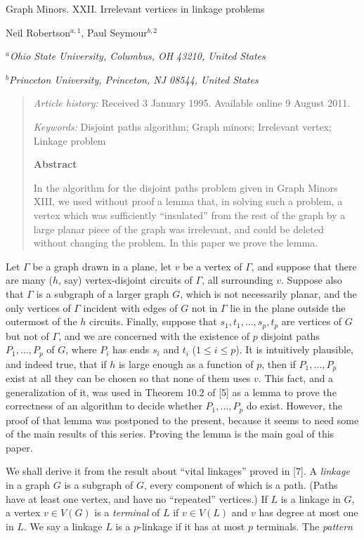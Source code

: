 {\centering
{\Large Graph Minors. XXII. Irrelevant vertices in linkage problems\par}\medskip

Neil Robertson$^{a,1}$, Paul Seymour$^{b,2}$\par
$^a$\textit{Ohio State University, Columbus, OH 43210, United States}\par
$^b$\textit{Princeton University, Princeton, NJ 08544, United States}\par
}
\begin{quote}
\textit{Article history:} Received 3 January 1995. Available online 9 August 2011.

\textit{Keywords:} Disjoint paths algorithm; Graph minors; Irrelevant vertex; Linkage problem

\textbf{Abstract}

In the algorithm for the disjoint paths problem given in Graph Minors XIII, we used without proof a lemma that, in solving such a problem, a vertex which was sufficiently ``insulated'' from the rest of the graph by a large planar piece of the graph was irrelevant, and could be deleted without changing the problem. In this paper we prove the lemma.
\end{quote}


Let $\Gamma$ be a graph drawn in a plane, let $v$ be a vertex of $\Gamma$, and suppose that there are many ($h$, say) vertex-disjoint circuits of $\Gamma$, all surrounding $v$. Suppose also that $\Gamma$ is a subgraph of a larger graph $G$, which is not necessarily planar, and the only vertices of $\Gamma$ incident with edges of $G$ not in $\Gamma$ lie in the plane outside the outermost of the $h$ circuits. Finally, suppose that $s_1, t_1, \ldots, s_p, t_p$ are vertices of $G$ but not of $\Gamma$, and we are concerned with the existence of $p$ disjoint paths $P_1, \ldots, P_p$ of $G$, where $P_i$ has ends $s_i$ and $t_i$ ($1 \le i \le p$). It is intuitively plausible, and indeed true, that if $h$ is large enough as a function of $p$, then if $P_1, \ldots, P_p$ exist at all they can be chosen so that none of them uses $v$. This fact, and a generalization of it, was used in Theorem 10.2 of [5] as a lemma to prove the correctness of an algorithm to decide whether $P_1, \ldots, P_p$ do exist. However, the proof of that lemma was postponed to the present, because it seems to need some of the main results of this series. Proving the lemma is the main goal of this paper.

We shall derive it from the result about ``vital linkages'' proved in [7]. A \textit{linkage} in a graph $G$ is a subgraph of $G$, every component of which is a path. (Paths have at least one vertex, and have no ``repeated'' vertices.) If $L$ is a linkage in $G$, a vertex $v \in V(G)$ is a \textit{terminal} of $L$ if $v \in V(L)$ and $v$ has degree at most one in $L$. We say a linkage $L$ is a $p$-linkage if it has at most $p$ terminals. The \textit{pattern}%
%
